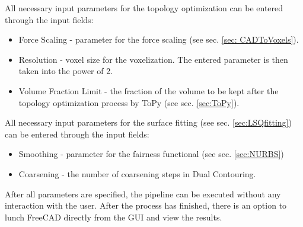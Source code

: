All necessary input parameters for the topology optimization can be entered through the input fields:
\begin{itemize}
\item Force Scaling - parameter for the force scaling (see sec. \ref{sec: CADToVoxels}).
\item Resolution - voxel size for the voxelization. The entered parameter is then taken into the power of 2.
\item Volume Fraction Limit - the fraction of the volume to be kept after the topology optimization process by ToPy (see sec. \ref{sec:ToPy}).
\end{itemize}
All necessary input parameters for the surface fitting (see sec. \ref{sec:LSQfitting}) can be entered through the input fields:
\begin{itemize}
\item Smoothing - parameter for the fairness functional (see sec. \ref{sec:NURBS})
\item Coarsening - the number of coarsening steps in Dual Contouring.
\end{itemize}

After all parameters are specified, the pipeline can  be executed without any interaction with the user. After the process has finished, there is an option to lunch FreeCAD directly from the GUI  and view the results.


